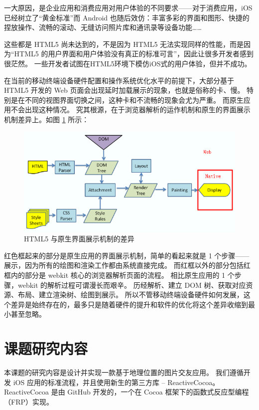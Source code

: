 一大原因，是企业应用和消费应用对用户体验的不同要求——对于消费应用，iOS 已经树立了“黄金标准”而 Android 也随后效仿：丰富多彩的界面和图形、快捷的捏放操作、流畅的滚动、无缝访问照片库和通讯录等设备功能……

这些都是 HTML5 尚未达到的，不是因为 HTML5 无法实现同样的性能，而是因为“HTML5 的用户界面和用户体验没有真正的标准可言”，因此让很多开发者感到很茫然。
一些开发者试图在HTML5环境下模仿iOS式的用户体验，但并不成功。

在当前的移动终端设备硬件配置和操作系统优化水平的前提下，大部分基于 HTML5 开发的 Web 页面会出现延时加载展示的现象，也就是俗称的卡、慢。
特别是在不同的视图界面切换之间，这种卡和不流畅的现象会尤为严重。
而原生应用不会出现这种情况。
究其根源，在于浏览器解析的运作机制和原生的界面展示机制差异上。如图 \ref{html5-native-comparison} 所示：

\begin{figure}[h!]
    \centering
    \includegraphics[width=400pt]{figure/html5_native_comparison.png}
    \caption{HTML5 与原生界面展示机制的差异}
    \label{html5-native-comparison}
\end{figure}

红色框起来的部分是原生应用的界面展示机制，简单的看起来就是 1 个步骤——展示，因为所有的绘图和渲染工作都由系统直接完成。
而红框以外的部分包括红框内的部分是 webkit 核心的浏览器解析页面的流程。
相比原生应用的 1 个步骤，webkit 的解析过程可谓漫长而艰辛。
历经解析、建立 DOM 树、获取对应资源、布局、建立渲染树、绘图到展示。
所以不管移动终端设备硬件如何发展，这个差异是始终存在的，最多只是随着硬件的提升和软件的优化将这个差异收缩到最小甚至忽略。

\section{课题研究内容}

本课题的研究内容是设计并实现一款基于地理位置的图片交友应用。
我们遵循开发 iOS 应用的标准流程，并且使用新生的第三方库 -- ReactiveCocoa。
ReactiveCocoa 是由 GitHub 开发的，一个在 Cocoa 框架下的函数式反应型编程（FRP）实现。

